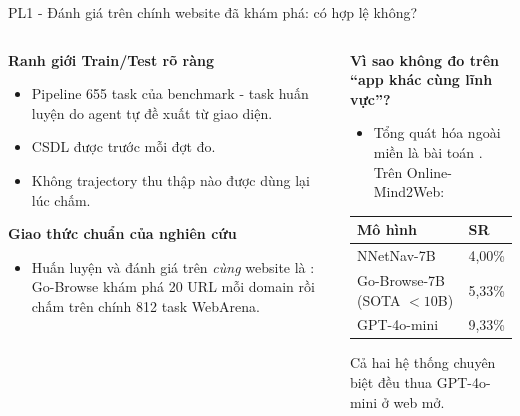 \begin{frame}{PL1 - Đánh giá trên chính website đã khám phá: có hợp lệ không?}
  \begin{columns}[t]
    \begin{column}{0.48\textwidth}
      \textbf{Ranh giới Train/Test rõ ràng}
      \begin{itemize}\setlength{\itemsep}{2.5pt}
        \item Pipeline  655 task của benchmark - task huấn luyện do agent tự đề xuất từ giao diện.
        \item CSDL được  trước mỗi đợt đo.
        \item Không trajectory thu thập nào được dùng lại lúc chấm.
      \end{itemize}

      \vspace{0.06cm}
      \textbf{Giao thức chuẩn của nghiên cứu}
      \begin{itemize}\setlength{\itemsep}{2.5pt}
        \item Huấn luyện và đánh giá trên \emph{cùng} website là : Go-Browse khám phá 20 URL mỗi domain rồi chấm trên chính 812 task WebArena.
      \end{itemize}
    \end{column}
    \hfill
    \begin{column}{0.48\textwidth}
      \textbf{Vì sao không đo trên ``app khác cùng lĩnh vực''?}
      \begin{itemize}\setlength{\itemsep}{2pt}
        \item Tổng quát hóa ngoài miền là bài toán . Trên Online-Mind2Web:
      \end{itemize}

      \vspace{-0.05cm}
      \setlength{\tabcolsep}{3pt}
      \begin{table}
        \begin{tabular}{@{}L{3.1cm} R{1.3cm}@{}}
          \toprule
          \textbf{Mô hình} & \textbf{SR} \\
          \midrule
          NNetNav-7B & 4,00\% \\
          Go-Browse-7B (SOTA ${<}10$B) & 5,33\% \\
          GPT-4o-mini & 9,33\% \\
          \bottomrule
        \end{tabular}
      \end{table}
      \vspace{-0.1cm}
      {\scriptsize Cả hai hệ thống chuyên biệt đều thua GPT-4o-mini ở web mở.}
    \end{column}
  \end{columns}
\end{frame}

